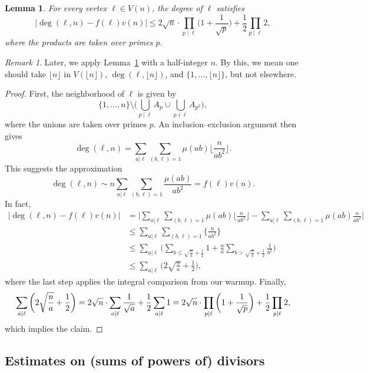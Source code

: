 \documentclass{article}
\theoremstyle{plain}
\newtheorem{lemma}[theorem]{Lemma}
\theoremstyle{definition}
\theoremstyle{remark}
\newtheorem*{remark}{Remark}
\begin{document}
\begin{lemma}
\label{lem.degree error}
For every vertex $\ell\in V(n)$, the degree of $\ell$ satisfies
\[
\big|\operatorname{deg}(\ell,n)-f(\ell)v(n)\big|
\leq2\sqrt{n}\cdot\prod_{p\mid\ell}\bigg(1+\frac{1}{\sqrt{p}}\bigg)+\frac{1}{2}\prod_{p\mid\ell}2,
\]
where the products are taken over primes $p$.
\end{lemma}
\begin{remark}
Later, we apply Lemma~\ref{lem.degree error} with a half-integer $n$.
By this, we mean one should take $\lfloor n\rfloor$ in $V(\lfloor n\rfloor)$, $\operatorname{deg}(\ell,\lfloor n\rfloor)$, and $\{1,\dotsc,\lfloor n\rfloor\}$, but not elsewhere.
\end{remark}
\begin{proof}
First, the neighborhood of $\ell$ is given by
\[
\{1,\ldots,n\}\setminus\bigg(\bigcup_{p\mid\ell}A_p\cup\bigcup_{p\nmid\ell}A_{p^2}\bigg),
\]
where the unions are taken over primes $p$.
An inclusion--exclusion argument then gives
\[
\operatorname{deg}(\ell,n)
=\sum_{a|\ell}\sum_{(b,\ell)=1}\mu(ab)\bigg\lfloor\frac{n}{ab^2}\bigg\rfloor.
\]
This suggests the approximation
\[
\operatorname{deg}(\ell,n)
\sim n\sum_{a|\ell}\sum_{(b,\ell)=1}\frac{\mu(ab)}{ab^2}
=f(\ell)v(n).
\]
In fact,
\begin{align*}
\big|\operatorname{deg}(\ell,n)-f(\ell)v(n)\big|
&=\bigg|\sum_{a|\ell}\sum_{(b,\ell)=1}\mu(ab)\bigg\lfloor\frac{n}{ab^2}\bigg\rfloor-\sum_{a|\ell}\sum_{(b,\ell)=1}\mu(ab)\frac{n}{ab^2}\bigg|\\
&\leq\sum_{a|\ell}\sum_{(b,\ell)=1}\bigg\{\frac{n}{ab^2}\bigg\}\\
&\leq\sum_{a|\ell}\bigg(\sum_{b\leq\sqrt{\frac{n}{a}}+\frac{1}{2}}1+\frac{n}{a}\sum_{b>\sqrt{\frac{n}{a}}+\frac{1}{2}}\frac{1}{b^2}\bigg)\\
&\leq\sum_{a|\ell}\bigg(2\sqrt{\frac{n}{a}}+\frac{1}{2}\bigg),
\end{align*}
where the last step applies the integral comparison from our warmup.
Finally,
\[
\sum_{a|\ell}\bigg(2\sqrt{\frac{n}{a}}+\frac{1}{2}\bigg)
=2\sqrt{n}\cdot\sum_{a|\ell}\frac{1}{\sqrt{a}}+\frac{1}{2}\sum_{a\mid\ell}1\\
=2\sqrt{n}\cdot\prod_{p\mid\ell}\bigg(1+\frac{1}{\sqrt{p}}\bigg)+\frac{1}{2}\prod_{p\mid\ell}2,
\]
which implies the claim.
\end{proof}

\subsection{Estimates on (sums of powers of) divisors}
\end{document}
